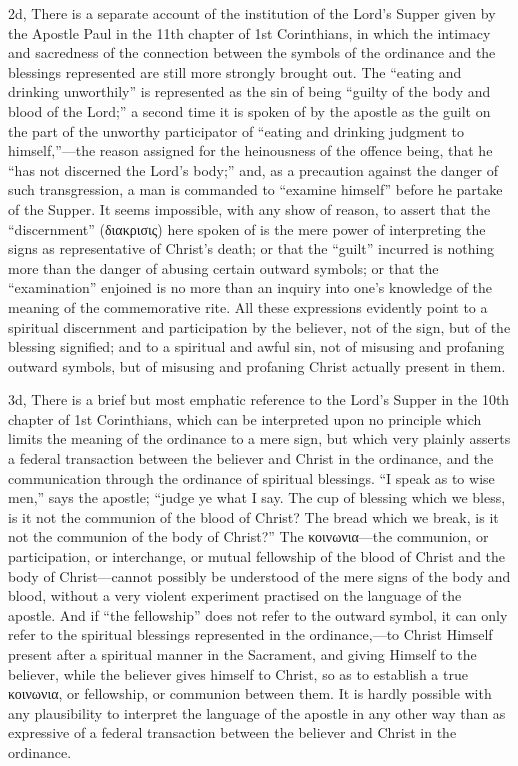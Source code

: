 \documentclass[]{book}
\begin{document}
2d, There is a separate account of the institution of the Lord's Supper given by the Apostle Paul in the 11th chapter of 1st Corinthians, in which the intimacy and sacredness of the connection between the symbols of the ordinance and the blessings represented are still more strongly brought out. The ``eating and drinking unworthily'' is represented as the sin of being ``guilty of the body and blood of the Lord;'' a second time it is spoken of by the apostle as the guilt on the part of the unworthy participator of ``eating and drinking judgment to himself,''---the reason assigned for the heinousness of the offence being, that he ``has not discerned the Lord's body;'' and, as a precaution against the danger of such transgression, a man is commanded to ``examine himself'' before he partake of the Supper. It seems impossible, with any show of reason, to assert that the ``discernment'' (διακρισις) here spoken of is the mere power of interpreting the signs as representative of Christ's death; or that the ``guilt'' incurred is nothing more than the danger of abusing certain outward symbols; or that the ``examination'' enjoined is no more than an inquiry into one's knowledge of the meaning of the commemorative rite. All these expressions evidently point to a spiritual discernment and participation by the believer, not of the sign, but of the blessing signified; and to a spiritual and awful sin, not of misusing and profaning outward symbols, but of misusing and profaning Christ actually present in them.

3d, There is a brief but most emphatic reference to the Lord's Supper in the 10th chapter of 1st Corinthians, which can be interpreted upon no principle which limits the meaning of the ordinance to a mere sign, but which very plainly asserts a federal transaction between the believer and Christ in the ordinance, and the communication through the ordinance of spiritual blessings. ``I speak as to wise men,'' says the apostle; ``judge ye what I say. The cup of blessing which we bless, is it not the communion of the blood of Christ? The bread which we break, is it not the communion of the body of Christ?'' The κοινωνια---the communion, or participation, or interchange, or mutual fellowship of the blood of Christ and the body of Christ---cannot possibly be understood of the mere signs of the body and blood, without a very violent experiment practised on the language of the apostle. And if ``the fellowship'' does not refer to the outward symbol, it can only refer to the spiritual blessings represented in the ordinance,---to Christ Himself present after a spiritual manner in the Sacrament, and giving Himself to the believer, while the believer gives himself to Christ, so as to establish a true κοινωνια, or fellowship, or communion between them. It is hardly possible with any plausibility to interpret the language of the apostle in any other way than as expressive of a federal transaction between the believer and Christ in the ordinance.
\end{document}
